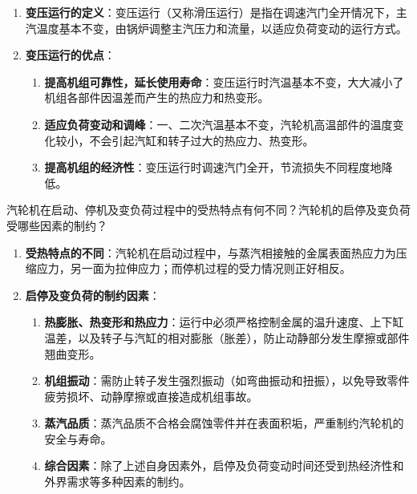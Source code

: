 \begin{solution}
\begin{enumerate}
  \item \textbf{变压运行的定义}：变压运行（又称滑压运行）是指在调速汽门全开情况下，主汽温度基本不变，由锅炉调整主汽压力和流量，以适应负荷变动的运行方式。
  \item \textbf{变压运行的优点}：
  \begin{enumerate}
    \item \textbf{提高机组可靠性，延长使用寿命}：变压运行时汽温基本不变，大大减小了机组各部件因温差而产生的热应力和热变形。
    \item \textbf{适应负荷变动和调峰}：一、二次汽温基本不变，汽轮机高温部件的温度变化较小，不会引起汽缸和转子过大的热应力、热变形。
    \item \textbf{提高机组的经济性}：变压运行时调速汽门全开，节流损失不同程度地降低。
  \end{enumerate}
\end{enumerate}
\end{solution}

\begin{problem}
汽轮机在启动、停机及变负荷过程中的受热特点有何不同？汽轮机的启停及变负荷受哪些因素的制约？
\end{problem}

\begin{solution}
\begin{enumerate}
  \item \textbf{受热特点的不同}：汽轮机在启动过程中，与蒸汽相接触的金属表面热应力为压缩应力，另一面为拉伸应力；而停机过程的受力情况则正好相反。
  \item \textbf{启停及变负荷的制约因素}：
  \begin{enumerate}
    \item \textbf{热膨胀、热变形和热应力}：运行中必须严格控制金属的温升速度、上下缸温差，以及转子与汽缸的相对膨胀（胀差），防止动静部分发生摩擦或部件翘曲变形。
    \item \textbf{机组振动}：需防止转子发生强烈振动（如弯曲振动和扭振），以免导致零件疲劳损坏、动静摩擦或直接造成机组事故。
    \item \textbf{蒸汽品质}：蒸汽品质不合格会腐蚀零件并在表面积垢，严重制约汽轮机的安全与寿命。
    \item \textbf{综合因素}：除了上述自身因素外，启停及负荷变动时间还受到热经济性和外界需求等多种因素的制约。
  \end{enumerate}
\end{enumerate}
\end{solution}

